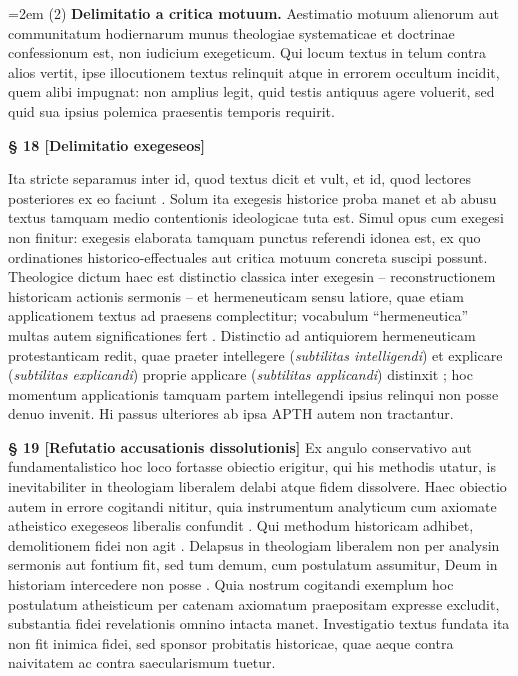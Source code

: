 \documentclass[11pt,a4paper]{article}
\makeatletter
\newcommand{\apth}{{\apthfont APTH}\hspace{0.15em}\xspace}
\newcommand{\subpar}[1]{%
  \begingroup
  \leftskip=2em %
  \noindent#1\par
  \endgroup
}
\newcommand{\apthsec}[3]{%
  \phantomsection%
  \def\@currentlabel{#1}%
  \label{sec:#3}%
  \textbf{§ #1 [#2]}%
}
\makeatother
\begin{document}
\subpar{(2) \textbf{Delimitatio a critica motuum.} Aestimatio motuum alienorum aut communitatum hodiernarum munus theologiae systematicae et doctrinae confessionum est, non iudicium exegeticum. Qui locum textus in telum contra alios vertit, ipse illocutionem textus relinquit atque in errorem occultum incidit, quem alibi impugnat: non amplius legit, quid testis antiquus agere voluerit, sed quid sua ipsius polemica praesentis temporis requirit.}

\apthsec{18}{Delimitatio exegeseos}{abgrenzung-exegese}
Ita stricte separamus inter id, quod textus dicit et vult, et id, quod lectores posteriores ex eo faciunt \citep{hirsch1967}. Solum ita exegesis historice proba manet et ab abusu textus tamquam medio contentionis ideologicae tuta est. Simul opus cum exegesi non finitur: exegesis elaborata tamquam punctus referendi idonea est, ex quo ordinationes historico-effectuales aut critica motuum concreta suscipi possunt. Theologice dictum haec est distinctio classica inter exegesin -- reconstructionem historicam actionis sermonis -- et hermeneuticam sensu latiore, quae etiam applicationem textus ad praesens complectitur; vocabulum ``hermeneutica'' multas autem significationes fert \citep{ebeling1959}. Distinctio ad antiquiorem hermeneuticam protestanticam redit, quae praeter intellegere (\textit{subtilitas intelligendi}) et explicare (\textit{subtilitas explicandi}) proprie applicare (\textit{subtilitas applicandi}) distinxit \citep{rambach1723}; \citet{gadamer1960} hoc momentum applicationis tamquam partem intellegendi ipsius relinqui non posse denuo invenit. Hi passus ulteriores ab ipsa \apth autem non tractantur.

\apthsec{19}{Refutatio accusationis dissolutionis}{verwaesserung} Ex angulo conservativo aut fundamentalistico hoc loco fortasse obiectio erigitur, qui his methodis utatur, is inevitabiliter in theologiam liberalem delabi atque fidem dissolvere. Haec obiectio autem in errore cogitandi nititur, quia instrumentum analyticum cum axiomate atheistico exegeseos liberalis confundit \citep{schlatter1905,troeltsch1913}. Qui methodum historicam adhibet, demolitionem fidei non agit \citep{stuhlmacher1979,wright1992,enns2005,sparks2008}. Delapsus in theologiam liberalem non per analysin sermonis aut fontium fit, sed tum demum, cum postulatum assumitur, Deum in historiam intercedere non posse \citep{harvey1966,lessing1777}. Quia nostrum cogitandi exemplum hoc postulatum atheisticum per catenam axiomatum praepositam expresse excludit, substantia fidei revelationis omnino intacta manet. Investigatio textus fundata ita non fit inimica fidei, sed sponsor probitatis historicae, quae aeque contra naivitatem ac contra saecularismum tuetur.
\end{document}
